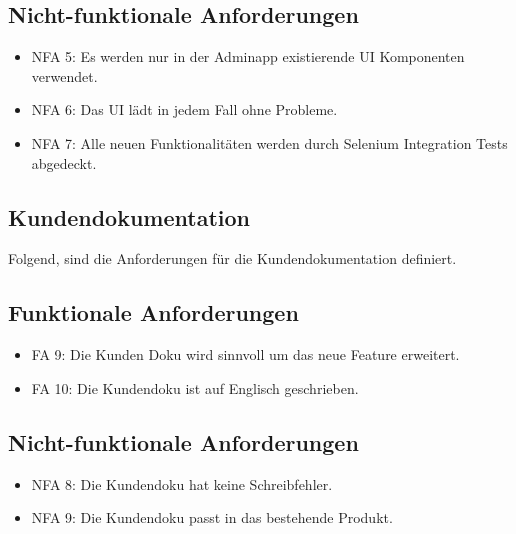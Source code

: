 \subsection*{Nicht-funktionale Anforderungen}
\begin{itemize}
	\item NFA 5: Es werden nur in der Adminapp existierende UI Komponenten verwendet.
	\item NFA 6: Das UI lädt in jedem Fall ohne Probleme.
	\item NFA 7: Alle neuen Funktionalitäten werden durch Selenium Integration Tests abgedeckt.
\end{itemize}

\subsection{Kundendokumentation}

Folgend, sind die Anforderungen für die Kundendokumentation definiert.

\subsection*{Funktionale Anforderungen}
\begin{itemize}
	\item FA 9: Die Kunden Doku wird sinnvoll um das neue Feature erweitert.
	\item FA 10: Die Kundendoku ist auf Englisch geschrieben.
\end{itemize}

\subsection*{Nicht-funktionale Anforderungen}
\begin{itemize}
	\item NFA 8: Die Kundendoku hat keine Schreibfehler. 
	\item NFA 9: Die Kundendoku passt in das bestehende Produkt.
\end{itemize}